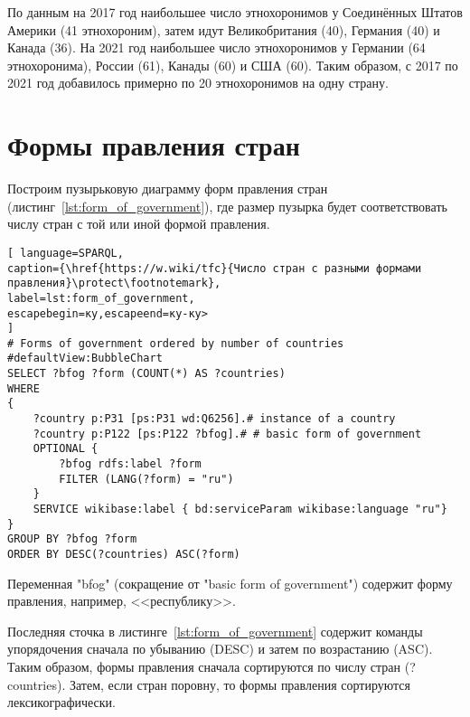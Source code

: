 
По данным на 2017 год наибольшее число этнохоронимов у Соединённых Штатов Америки (41 этнохороним), затем идут Великобритания (40), Германия (40) и Канада (36). На 2021 год наибольшее число этнохоронимов у Германии (64 этнохоронима), России (61), Канады (60) и США (60). Таким образом, с 2017 по 2021 год добавилось примерно по 20 этнохоронимов на одну страну.


\section{Формы правления стран}

Построим пузырьковую диаграмму форм правления стран (листинг~\ref{lst:form_of_government}), где размер пузырка будет соответствовать числу стран с той или иной формой правления.


\begin{lstlisting}[ language=SPARQL, 
caption={\href{https://w.wiki/tfc}{Число стран с разными формами правления}\protect\footnotemark},
label=lst:form_of_government, 
escapebegin=ку,escapeend=ку-ку>
]
# Forms of government ordered by number of countries
#defaultView:BubbleChart
SELECT ?bfog ?form (COUNT(*) AS ?countries)
WHERE 
{
	?country p:P31 [ps:P31 wd:Q6256].# instance of a country
	?country p:P122 [ps:P122 ?bfog].# # basic form of government
	OPTIONAL {
		?bfog rdfs:label ?form
		FILTER (LANG(?form) = "ru")
	}
	SERVICE wikibase:label { bd:serviceParam wikibase:language "ru"}
}
GROUP BY ?bfog ?form
ORDER BY DESC(?countries) ASC(?form)
\end{lstlisting}


Переменная "bfog" (сокращение от "basic form of government") содержит форму правления, например, <<республику>>. 

Последняя сточка в листинге~\ref{lst:form_of_government} содержит команды упорядочения сначала по убыванию (DESC) и затем по возрастанию (ASC). Таким образом, формы правления сначала сортируются по числу стран (?countries). Затем, если стран поровну, то формы правления сортируются  лексикографически\protect\footnotemark. 

